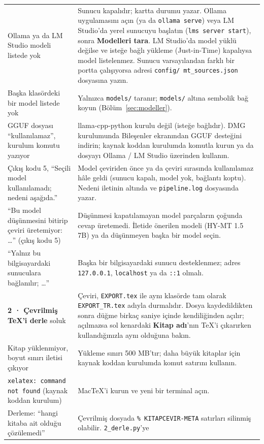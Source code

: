 \documentclass[11pt,a4paper]{article}
\newcommand{\dugme}[1]{\textsf{\bfseries #1}}
\newcommand{\dosya}[1]{\texttt{#1}}
\begin{document}
\begin{longtable}{@{}L{5.7cm}L{9.7cm}@{}}
Ollama ya da LM Studio modeli listede yok & Sunucu kapalıdır; kartta durumu
yazar. Ollama uygulamasını açın (ya da \dosya{ollama serve}) veya LM
Studio'da yerel sunucuyu başlatın (\dosya{lms server start}), sonra
\dugme{Modelleri tara}. LM Studio'da model yüklü değilse ve isteğe bağlı
yükleme (Just-in-Time) kapalıysa model listelenmez. Sunucu varsayılandan
farklı bir portta çalışıyorsa adresi \dosya{config/\allowbreak
mt\_sources.json} dosyasına yazın. \\
Başka klasördeki bir model listede yok & Yalnızca \dosya{models/} taranır;
\dosya{models/} altına sembolik bağ koyun (Bölüm~\ref{sec:modeller}). \\
GGUF dosyası ``kullanılamaz'', kurulum komutu yazıyor & llama-cpp-python
kurulu değil (isteğe bağlıdır). DMG kurulumunda Bileşenler ekranından GGUF
desteğini indirin; kaynak koddan kurulumda komutla kurun ya da dosyayı
Ollama / LM Studio üzerinden kullanın. \\
Çıkış kodu 5, ``Seçili model kullanılamadı; nedeni aşağıda.'' & Model
çeviriden önce ya da çeviri sırasında kullanılamaz hâle geldi (sunucu kapalı,
model yok, bağlantı koptu). Nedeni iletinin altında ve \dosya{pipeline.log}
dosyasında yazar. \\
``Bu model düşünmesini bitirip çeviri üretemiyor: \ldots'' (çıkış kodu 5) &
Düşünmesi kapatılamayan model parçaların çoğunda cevap üretemedi. İletide
önerilen modeli (HY-MT 1.5 7B) ya da düşünmeyen başka bir model seçin. \\
``Yalnız bu bilgisayardaki sunuculara bağlanılır; \ldots'' & Başka bir
bilgisayardaki sunucu desteklenmez; adres \dosya{127.0.0.1},
\dosya{localhost} ya da \dosya{::1} olmalı. \\
\dugme{2 · Çevrilmiş TeX'i derle} soluk & Çeviri, \dosya{EXPORT.tex} ile aynı
klasörde tam olarak \dosya{EXPORT\_TR.tex} adıyla durmalıdır. Dosya
kaydedildikten sonra düğme birkaç saniye içinde kendiliğinden açılır;
açılmazsa sol kenardaki \dugme{Kitap adı}'nın TeX'i çıkarırken
kullandığınızla aynı olduğuna bakın. \\
Kitap yüklenmiyor, boyut sınırı iletisi çıkıyor & Yükleme sınırı 500 MB'tır;
daha büyük kitaplar için kaynak koddan kurulumda komut satırını kullanın. \\
\dosya{xelatex: command not found} (kaynak koddan kurulum) & MacTeX'i kurun
ve yeni bir terminal açın. \\
Derleme: ``hangi kitaba ait olduğu çözülemedi'' & Çevrilmiş dosyada
\dosya{\% KITAPCEVIR-META} satırları silinmiş olabilir. \dosya{2\_derle.py}'ye

\end{longtable}
\end{document}
